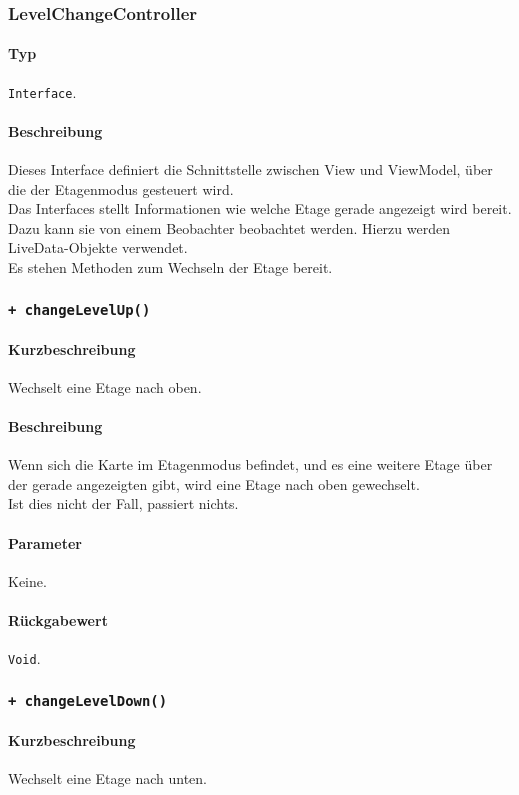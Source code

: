 \subsubsection{LevelChangeController}
\paragraph*{Typ}
\texttt{Interface}.
\paragraph*{Beschreibung}
Dieses Interface definiert die Schnittstelle zwischen View und ViewModel, über die 
der Etagenmodus gesteuert wird.\\
Das Interfaces stellt Informationen wie welche Etage gerade angezeigt wird bereit.
Dazu kann sie von einem Beobachter beobachtet werden. Hierzu werden LiveData-Objekte verwendet.\\
Es stehen Methoden zum Wechseln der Etage bereit.\\

\subsubsection*{\texttt{+ changeLevelUp()}}%
\paragraph*{Kurzbeschreibung}
Wechselt eine Etage nach oben.
\paragraph*{Beschreibung}
Wenn sich die Karte im Etagenmodus befindet, und es eine weitere Etage über der gerade 
angezeigten gibt, wird eine Etage nach oben gewechselt.\\
Ist dies nicht der Fall, passiert nichts.
\paragraph*{Parameter}
Keine.
\paragraph*{Rückgabewert}
\texttt{Void}.

\subsubsection*{\texttt{+ changeLevelDown()}}%
\paragraph*{Kurzbeschreibung}
Wechselt eine Etage nach unten.
